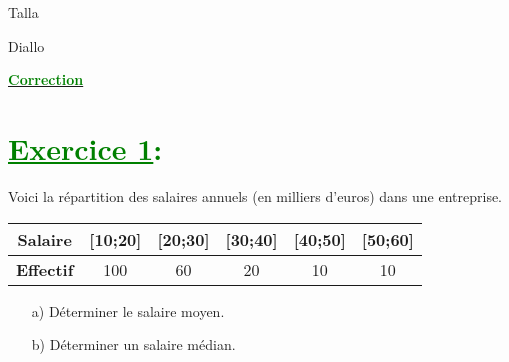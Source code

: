 \documentclass[12pt]{article}
\begin{document}
\begin{minipage}{0.8\textwidth}
	Talla                        
\end{minipage}
\begin{minipage}{0.8\textwidth}
	Diallo 
\end{minipage}

\begin{center}
\textbf{{\underline{\textcolor{green}{Correction}}}}
\end{center}
\section*{\textcolor{green}{\underline{Exercice 1}:}}

Voici la répartition des salaires annuels (en milliers d'euros) dans une entreprise.

\begin{tabular}{|c|c|c|c|c|c|}
  \hline
  \textbf{Salaire} & [10;20] & [20;30] & [30;40] & [40;50] & [50;60]\\
  \hline
    \textbf{Effectif}& 100 & 60 & 20 & 10 & 10\\
  \hline
\end{tabular}

\begin{enumerate}
  \item[a)] Déterminer le salaire moyen.
  \item[b)] Déterminer un salaire médian.
\end{enumerate}
\end{document}
